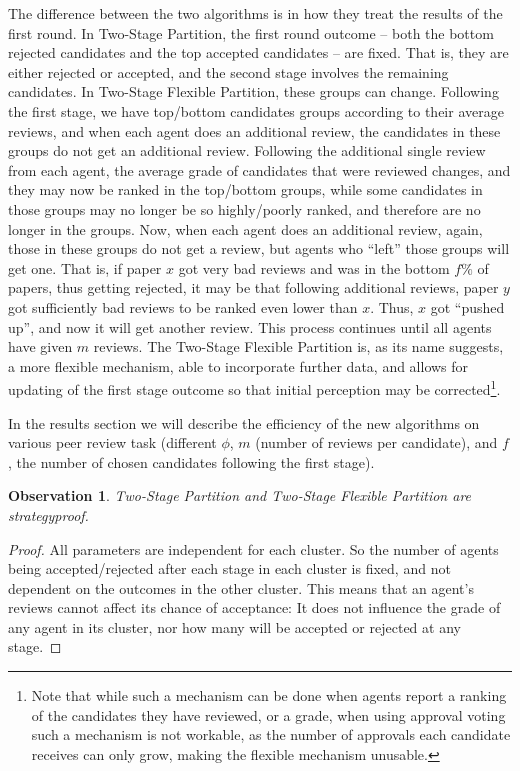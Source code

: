 \documentclass[letterpaper]{article} %
\newtheorem{observation}{Observation}
\begin{document}
The difference between the two algorithms is in how they treat the results of the first round. In Two-Stage Partition, the first round outcome -- both the bottom rejected candidates and the top accepted candidates -- are fixed. That is, they are either rejected or accepted, and the second stage involves the remaining candidates. In Two-Stage Flexible Partition, these groups can change. Following the first stage, we have top/bottom candidates groups according to their average reviews, and when each agent does an additional review, the candidates in these groups do not get an additional review. Following the additional single review from each agent, the average grade of candidates that were reviewed changes, and they may now be ranked in the top/bottom groups, while some candidates in those groups may no longer be so highly/poorly ranked, and therefore are no longer in the groups. Now, when each agent does an additional review, again, those in these groups do not get a review, but agents who ``left'' those groups will get one. That is, if paper $x$ got very bad reviews and was in the bottom $f\%$ of papers, thus getting rejected, it may be that following additional reviews, paper $y$ got sufficiently bad reviews to be ranked even lower than $x$. Thus, $x$ got ``pushed up'', and now it will get another review. This process continues until all agents have given $m$ reviews.
The Two-Stage Flexible Partition is, as its name suggests, a more flexible mechanism, able to incorporate further data, and allows for updating of the first stage outcome so that initial perception may be corrected\footnote{Note that while such a mechanism can be done when agents report a ranking of the candidates they have reviewed, or a grade, when using approval voting such a mechanism is not workable, as the number of approvals each candidate receives can only grow, making the flexible mechanism unusable.}.

In the results section we will describe the efficiency of the new algorithms on various peer review task (different $\phi$, $m$ (number of reviews per candidate), and $f$, the number of chosen candidates following the first stage). %

\begin{observation}
Two-Stage Partition and Two-Stage Flexible Partition are strategyproof.
\end{observation}
\begin{proof}
All parameters are independent for each cluster. So the number of agents being accepted/rejected after each stage in each cluster is fixed, and not dependent on the outcomes in the other cluster. This means that an agent's reviews cannot affect its chance of acceptance: It does not influence the grade of any agent in its cluster, nor how many will be accepted or rejected at any stage.
\end{proof}
\end{document}
